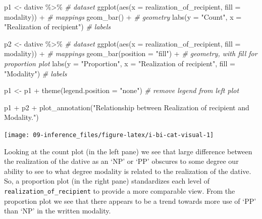 \documentclass[
]{article}
\newenvironment{Shaded}{\begin{snugshade}}{\end{snugshade}}
\newcommand{\AttributeTok}[1]{\textcolor[rgb]{0.77,0.63,0.00}{#1}}
\newcommand{\CommentTok}[1]{\textcolor[rgb]{0.56,0.35,0.01}{\textit{#1}}}
\newcommand{\FunctionTok}[1]{\textcolor[rgb]{0.00,0.00,0.00}{#1}}
\newcommand{\NormalTok}[1]{#1}
\newcommand{\OtherTok}[1]{\textcolor[rgb]{0.56,0.35,0.01}{#1}}
\newcommand{\SpecialCharTok}[1]{\textcolor[rgb]{0.00,0.00,0.00}{#1}}
\newcommand{\StringTok}[1]{\textcolor[rgb]{0.31,0.60,0.02}{#1}}
\begin{document}
\begin{Shaded}
\begin{Highlighting}[]
\NormalTok{p1 }\OtherTok{\textless{}{-}} 
\NormalTok{  dative }\SpecialCharTok{\%\textgreater{}\%} \CommentTok{\# dataset}
  \FunctionTok{ggplot}\NormalTok{(}\FunctionTok{aes}\NormalTok{(}\AttributeTok{x =}\NormalTok{ realization\_of\_recipient, }\AttributeTok{fill =}\NormalTok{ modality)) }\SpecialCharTok{+} \CommentTok{\# mappings}
  \FunctionTok{geom\_bar}\NormalTok{() }\SpecialCharTok{+} \CommentTok{\# geometry}
  \FunctionTok{labs}\NormalTok{(}\AttributeTok{y =} \StringTok{"Count"}\NormalTok{, }\AttributeTok{x =} \StringTok{"Realization of recipient"}\NormalTok{) }\CommentTok{\# labels}

\NormalTok{p2 }\OtherTok{\textless{}{-}} 
\NormalTok{  dative }\SpecialCharTok{\%\textgreater{}\%} \CommentTok{\# dataset}
  \FunctionTok{ggplot}\NormalTok{(}\FunctionTok{aes}\NormalTok{(}\AttributeTok{x =}\NormalTok{ realization\_of\_recipient, }\AttributeTok{fill =}\NormalTok{ modality)) }\SpecialCharTok{+} \CommentTok{\# mappings}
  \FunctionTok{geom\_bar}\NormalTok{(}\AttributeTok{position =} \StringTok{"fill"}\NormalTok{) }\SpecialCharTok{+} \CommentTok{\# geometry, with fill for proportion plot}
  \FunctionTok{labs}\NormalTok{(}\AttributeTok{y =} \StringTok{"Proportion"}\NormalTok{, }\AttributeTok{x =} \StringTok{"Realization of recipient"}\NormalTok{, }\AttributeTok{fill =} \StringTok{"Modality"}\NormalTok{) }\CommentTok{\# labels}

\NormalTok{p1 }\OtherTok{\textless{}{-}}\NormalTok{ p1 }\SpecialCharTok{+} \FunctionTok{theme}\NormalTok{(}\AttributeTok{legend.position =} \StringTok{"none"}\NormalTok{) }\CommentTok{\# remove legend from left plot}

\NormalTok{p1 }\SpecialCharTok{+}\NormalTok{ p2 }\SpecialCharTok{+} \FunctionTok{plot\_annotation}\NormalTok{(}\StringTok{"Relationship between Realization of recipient and Modality."}\NormalTok{)}
\end{Highlighting}
\end{Shaded}

\begin{center}\texttt{[image: 09-inference\_files/figure-latex/i-bi-cat-visual-1]} \end{center}

Looking at the count plot (in the left pane) we see that large difference between the realization of the dative as an `NP' or `PP' obscures to some degree our ability to see to what degree modality is related to the realization of the dative. So, a proportion plot (in the right pane) standardizes each level of \texttt{realization\_of\_recipient} to provide a more comparable view. From the proportion plot we see that there appears to be a trend towards more use of `PP' than `NP' in the written modality.
\end{document}
